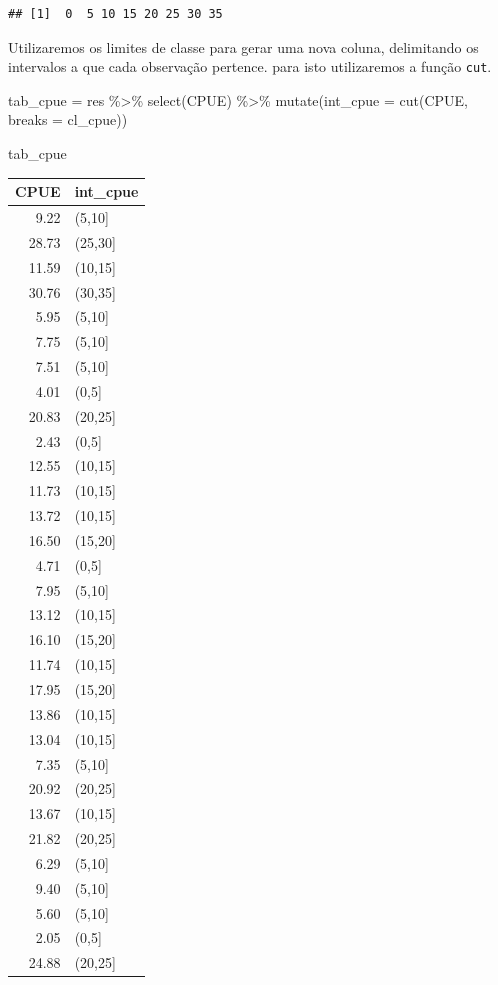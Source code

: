 \documentclass[
]{book}
\newenvironment{Shaded}{\begin{snugshade}}{\end{snugshade}}
\newcommand{\AttributeTok}[1]{\textcolor[rgb]{0.77,0.63,0.00}{#1}}
\newcommand{\FunctionTok}[1]{\textcolor[rgb]{0.00,0.00,0.00}{#1}}
\newcommand{\NormalTok}[1]{#1}
\newcommand{\OtherTok}[1]{\textcolor[rgb]{0.56,0.35,0.01}{#1}}
\newcommand{\SpecialCharTok}[1]{\textcolor[rgb]{0.00,0.00,0.00}{#1}}
\begin{document}
\begin{verbatim}
## [1]  0  5 10 15 20 25 30 35
\end{verbatim}

Utilizaremos os limites de classe para gerar uma nova coluna, delimitando os intervalos a que cada observação pertence. para isto utilizaremos a função \texttt{cut}.

\begin{Shaded}
\begin{Highlighting}[]
\NormalTok{tab\_cpue }\OtherTok{=}\NormalTok{ res }\SpecialCharTok{\%\textgreater{}\%} 
  \FunctionTok{select}\NormalTok{(CPUE) }\SpecialCharTok{\%\textgreater{}\%} 
  \FunctionTok{mutate}\NormalTok{(}\AttributeTok{int\_cpue =} \FunctionTok{cut}\NormalTok{(CPUE, }\AttributeTok{breaks =}\NormalTok{ cl\_cpue))}

\NormalTok{tab\_cpue}
\end{Highlighting}
\end{Shaded}

\begin{tabular}{r|l}
\hline
CPUE & int\_cpue\\
\hline
9.22 & (5,10]\\
\hline
28.73 & (25,30]\\
\hline
11.59 & (10,15]\\
\hline
30.76 & (30,35]\\
\hline
5.95 & (5,10]\\
\hline
7.75 & (5,10]\\
\hline
7.51 & (5,10]\\
\hline
4.01 & (0,5]\\
\hline
20.83 & (20,25]\\
\hline
2.43 & (0,5]\\
\hline
12.55 & (10,15]\\
\hline
11.73 & (10,15]\\
\hline
13.72 & (10,15]\\
\hline
16.50 & (15,20]\\
\hline
4.71 & (0,5]\\
\hline
7.95 & (5,10]\\
\hline
13.12 & (10,15]\\
\hline
16.10 & (15,20]\\
\hline
11.74 & (10,15]\\
\hline
17.95 & (15,20]\\
\hline
13.86 & (10,15]\\
\hline
13.04 & (10,15]\\
\hline
7.35 & (5,10]\\
\hline
20.92 & (20,25]\\
\hline
13.67 & (10,15]\\
\hline
21.82 & (20,25]\\
\hline
6.29 & (5,10]\\
\hline
9.40 & (5,10]\\
\hline
5.60 & (5,10]\\
\hline
2.05 & (0,5]\\
\hline
24.88 & (20,25]\\
\hline
\end{tabular}
\end{document}
